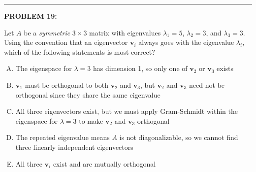 \documentclass[12pt]{amsart}
\newcommand{\divider}{
  \vspace{-1em} %
  \noindent
  \raisebox{-0.15ex}{\textbullet}%
  \hspace{0.5em}%
  \rule[0.5ex]{0.95\textwidth}{1.0pt}%
  \hspace{0.5em}%
  \raisebox{-0.15ex}{\textbullet}%
  \vspace{0em} %
}
\begin{document}

\divider


{\bf PROBLEM 19:}

Let $A$ be a \textit{symmetric} $3 \times 3$ matrix with eigenvalues $\lambda_1 = 5$, $\lambda_2 = 3$, and $\lambda_3 = 3$. Using the convention that an eigenvector $\mathbf{v}_i$ always goes with the eigenvalue $\lambda_i$, which of the following statements is most correct?

\begin{enumerate}[(A)]
\item The eigenspace for $\lambda = 3$ has dimension 1, so only one of $\mathbf{v}_2$ or $\mathbf{v}_3$ exists
\item $\mathbf{v}_1$ must be orthogonal to both $\mathbf{v}_2$ and $\mathbf{v}_3$, but $\mathbf{v}_2$ and $\mathbf{v}_3$ need not be orthogonal since they share the same eigenvalue
\item All three eigenvectors exist, but we must apply Gram-Schmidt within the eigenspace for $\lambda = 3$ to make $\mathbf{v}_2$ and $\mathbf{v}_3$ orthogonal
\item The repeated eigenvalue means $A$ is not diagonalizable, so we cannot find three linearly independent eigenvectors
\item All three $\mathbf{v}_i$ exist and are mutually orthogonal
\end{enumerate}
\end{document}
